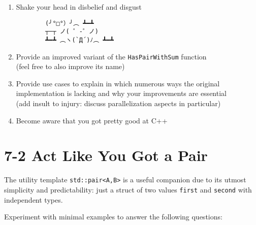 \documentclass[]{article}
\providecommand{\tightlist}{%
  \setlength{\itemsep}{0pt}\setlength{\parskip}{0pt}}
\begin{document}
\begin{enumerate}
\def\labelenumi{\arabic{enumi}.}
\tightlist
\item
  Shake your head in disbelief and disgust
        \begin{verbatim}
        (╯°□°）╯︵ ┻━┻
        ┬─┬﻿ ノ( ゜-゜ノ)
        ┻━┻ ︵ヽ(`Д´)ﾉ︵﻿ ┻━┻
        \end{verbatim}
\item
  Provide an improved variant of the \texttt{HasPairWithSum} function\\
   (feel free to also improve its name)
\item
  Provide use cases to explain in which numerous ways the original
  implementation is lacking and why your improvements are essential\\
   (add insult to injury: discuss parallelization aspects in particular)

\item
  Become aware that you got pretty good at C++
\end{enumerate}

\section{7-2 Act Like You Got a Pair}\label{act-like-you-got-a-pair}

The utility template \texttt{std::pair\textless{}A,B\textgreater{}} is a
useful companion due to its utmost simplicity and predictability: just a
struct of two values \texttt{first} and \texttt{second} with independent
types.

Experiment with minimal examples to answer the following questions:
\end{document}
